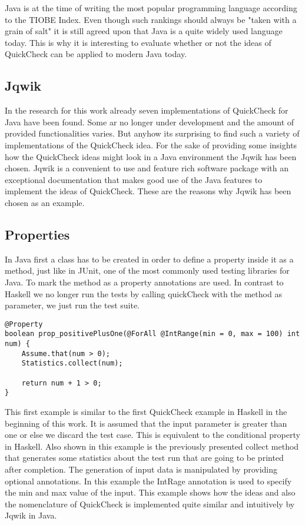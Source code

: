 \documentclass[a4paper, 12pt]{article} %
\begin{document}
Java is at the time of writing the most popular programming language according to the TIOBE Index. \cite{tiobe2018} Even though such rankings should always be "taken with a grain of salt" it is still agreed upon that Java is a quite widely used language today. This is why it is interesting to evaluate whether or not the ideas of QuickCheck can be applied to modern Java today.

\subsection{Jqwik}

In the research for this work already seven implementations of QuickCheck for Java have been found. Some ar no longer under development and the amount of provided functionalities varies. But anyhow its surprising to find such a variety of implementations of the QuickCheck idea. For the sake of providing some insights how the QuickCheck ideas might look in a Java environment the Jqwik \cite{jqwik} has been chosen. Jqwik is a convenient to use and feature rich software package with an exceptional documentation that makes good use of the Java features to implement the ideas of QuickCheck. These are the reasons why Jqwik has been chosen as an example.

\subsection{Properties}

In Java first a class has to be created in order to define a property inside it as a method, just like in JUnit, one of the most commonly used testing libraries for Java. To mark the method as a property annotations are used. In contrast to Haskell we no longer run the tests by calling quickCheck with the method as parameter, we just run the test suite. 

\begin{verbatim}
@Property
boolean prop_positivePlusOne(@ForAll @IntRange(min = 0, max = 100) int num) {
    Assume.that(num > 0);
    Statistics.collect(num);
    
    return num + 1 > 0;
}
\end{verbatim}

This first example is similar to the first QuickCheck example in Haskell in the beginning of this work. It is assumed that the input parameter is greater than one or else we discard the test case. This is equivalent to the conditional property in Haskell. Also shown in this example is the previously presented collect method that generates some statistics about the test run that are going to be printed after completion. The generation of input data is manipulated by providing optional annotations. In this example the IntRage annotation is used to specify the min and max value of the input. This example shows how the ideas and also the nomenclature of QuickCheck is implemented quite similar and intuitively by Jqwik in Java.
\end{document}
